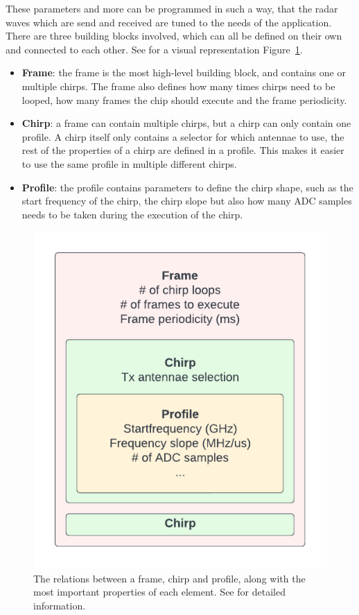 These parameters and more can be programmed in such a way, that the radar waves which are send and received are tuned to the needs of the application. There are three building blocks involved, which can all be defined on their own and connected to each other. See for a visual representation Figure~\ref{fig:chirpframeprofile}.

\begin{itemize}
    \item \textbf{Frame}: the frame is the most high-level building block, and contains one or multiple chirps. The frame also defines how many times chirps need to be looped, how many frames the chip should execute and the frame periodicity.
    \item \textbf{Chirp}: a frame can contain multiple chirps, but a chirp can only contain one profile. A chirp itself only contains a selector for which antennae to use, the rest of the properties of a chirp are defined in a profile. This makes it easier to use the same profile in multiple different chirps.
    \item \textbf{Profile}: the profile contains parameters to define the chirp shape, such as the start frequency of the chirp, the chirp slope but also how many ADC samples needs to be taken during the execution of the chirp.
\end{itemize}

\begin{figure}[t]
\centering
\includegraphics[width=.5\textwidth]{figures/background/chirp frame profile.pdf}
\caption{The relations between a frame, chirp and profile, along with the most important properties of each element. See \cite{mmwavesdk_website} for detailed information.}
\label{fig:chirpframeprofile}
\end{figure}

